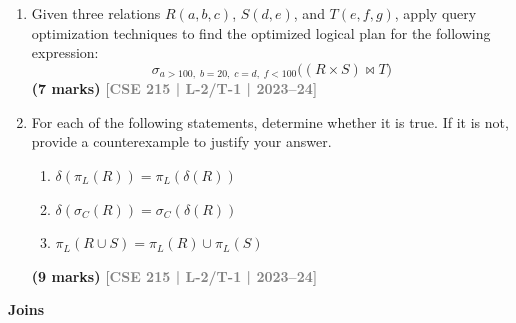 \documentclass[12pt,a3paper]{article}
\newcommand{\yr}[1]{\hfill\textcolor{gray}{\small\textbf{[#1]}}}
\newcommand{\mk}[1]{\textcolor{orange!70!black}{\small\textbf{(#1 marks)}}}
\newcommand{\subtopic}[2]{%
  \vspace{10pt}
  \noindent\begin{tcolorbox}[colback=#1!8,colframe=#1,boxrule=0.6pt,arc=4pt,
    left=6pt,right=6pt,top=4pt,bottom=4pt]
    \small\bfseries\textcolor{#1}{#2}
  \end{tcolorbox}
  \vspace{2pt}
}
\begin{document}
\begin{enumerate}
\mk{15} \yr{CSE 215 | L-2/T-2 | 2021--22}

\item Given three relations $R(a, b, c)$, $S(d, e)$, and $T(e, f, g)$, apply query optimization techniques to find the optimized logical plan for the following expression:
\[\sigma_{a>100,\; b=20,\; c=d,\; f<100}\bigl((R \times S) \bowtie T\bigr)\]
\mk{7} \yr{CSE 215 | L-2/T-1 | 2023--24}

\item For each of the following statements, determine whether it is true. If it is not, provide a counterexample to justify your answer.
\begin{enumerate}
  \item $\delta(\pi_L(R)) = \pi_L(\delta(R))$
  \item $\delta(\sigma_C(R)) = \sigma_C(\delta(R))$
  \item $\pi_L(R \cup S) = \pi_L(R) \cup \pi_L(S)$
\end{enumerate}
\mk{9} \yr{CSE 215 | L-2/T-1 | 2023--24}

\end{enumerate}

\subtopic{cD}{Joins}
\label{sub:s6-joins}
\end{document}
